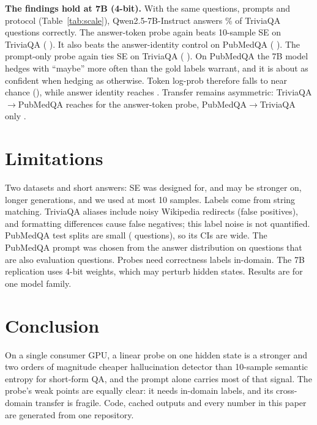 \documentclass[10pt,twocolumn]{article}
\begin{document}
\begin{table}[t]
\centering\scriptsize

\caption{3B vs.\ 7B (4-bit NF4): accuracy and AUROC on the same 500 questions.}
\label{tab:scale}
\end{table}

\textbf{The findings hold at 7B (4-bit).} With the same questions, prompts and protocol
(Table~\ref{tab:scale}), Qwen2.5-7B-Instruct answers \SvTqAcc\% of TriviaQA questions
correctly. The answer-token probe again beats 10-sample SE on TriviaQA
(\SvTqDProbeAnsvsSEten{} \SvTqDCiProbeAnsvsSEten{}). It also beats the answer-identity
control on PubMedQA (\SvPmDProbeAnsvsAnsId{} \SvPmDCiProbeAnsvsAnsId{}). The prompt-only
probe again ties SE on TriviaQA (\SvTqDProbePromptvsSEten{} \SvTqDCiProbePromptvsSEten{}).
On PubMedQA the 7B model hedges with ``maybe'' more often than the gold labels warrant, and
it is about as confident when hedging as otherwise. Token log-prob therefore falls to near
chance (\SvPmAucLogProb{}), while answer identity reaches \SvPmAucAnsId{}. Transfer remains
asymmetric: TriviaQA$\to$PubMedQA reaches \SvTrTqtoPmProbeAns{} for the answer-token probe,
PubMedQA$\to$TriviaQA only \SvTrPmtoTqProbeAns{}.

\section{Limitations}
Two datasets and short answers: SE was designed for, and may be stronger on, longer
generations, and we used at most 10 samples. Labels come from string matching. TriviaQA
aliases include noisy Wikipedia redirects (false positives), and formatting differences
cause false negatives; this label noise is not quantified. PubMedQA test splits are small
(\PmTestN{} questions), so its CIs are wide. The PubMedQA prompt was chosen from the
answer distribution on \PilotN{} questions that are also evaluation questions. Probes need correctness labels in-domain. The 7B
replication uses 4-bit weights, which may perturb hidden states. Results are for one model
family.

\section{Conclusion}
On a single consumer GPU, a linear probe on one hidden state is a stronger and two orders
of magnitude cheaper hallucination detector than 10-sample semantic entropy for short-form
QA, and the prompt alone carries most of that signal. The probe's weak points are equally
clear: it needs in-domain labels, and its cross-domain transfer is fragile. Code, cached
outputs and every number in this paper are generated from one repository.
\end{document}
